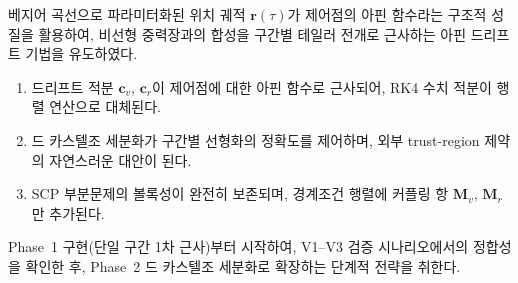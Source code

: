 \documentclass[11pt]{article}
\begin{document}
베지어 곡선으로 파라미터화된 위치 궤적 $\mathbf{r}(\tau)$가 제어점의 아핀 함수라는
구조적 성질을 활용하여, 비선형 중력장과의 합성을 구간별 테일러 전개로 근사하는
아핀 드리프트 기법을 유도하였다.

\begin{enumerate}
  \item 드리프트 적분 $\mathbf{c}_v$, $\mathbf{c}_r$이 제어점에 대한
        아핀 함수로 근사되어, RK4 수치 적분이 행렬 연산으로 대체된다.
  \item 드 카스텔조 세분화가 구간별 선형화의 정확도를 제어하며,
        외부 trust-region 제약의 자연스러운 대안이 된다.
  \item SCP 부분문제의 볼록성이 완전히 보존되며,
        경계조건 행렬에 커플링 항 $\mathbf{M}_v$, $\mathbf{M}_r$만 추가된다.
\end{enumerate}

Phase~1 구현(단일 구간 1차 근사)부터 시작하여, V1--V3 검증 시나리오에서의
정합성을 확인한 후, Phase~2 드 카스텔조 세분화로 확장하는 단계적 전략을 취한다.



\end{document}
